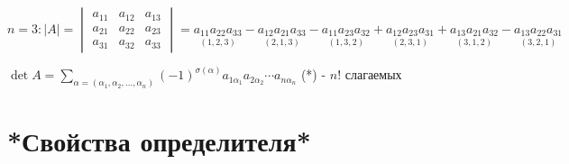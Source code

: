 $n=3: |A|=\begin{vmatrix}
a_{11} & a_{12} & a_{13} \\ 
a_{21} & a_{22} & a_{23} \\
a_{31} & a_{32} & a_{33}
\end{vmatrix}=\underset{(1,2,3)}{a_{11}a_{22}a_{33}}-\underset{(2,1,3)}{a_{12}a_{21}a_{33}}-\underset{(1,3,2)}{a_{11}a_{23}a_{32}}+\underset{(2,3,1)}{a_{12}a_{23}a_{31}}+\underset{(3,1,2)}{a_{13}a_{21}a_{32}}-\underset{(3,2,1)}{a_{13}a_{22}a_{31}}$

$\det A=\sum\limits_{\alpha=(\alpha_1,\alpha_2,\ldots,\alpha_n)}(-1)^{\sigma(\alpha)}a_{1\alpha_1}a_{2\alpha_2}\cdots{}a_{n\alpha_n}$ (*) - $n!$ слагаемых
\section{*Свойства определителя*}
